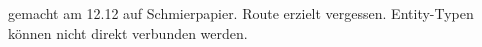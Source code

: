 \documentclass{lehramt-informatik}
\begin{document}
\begin{antwort}[falsch]
gemacht am 12.12 auf Schmierpapier. Route erzielt vergessen. Entity-Typen
können nicht direkt verbunden werden.
\end{antwort}

%



%


\end{document}
